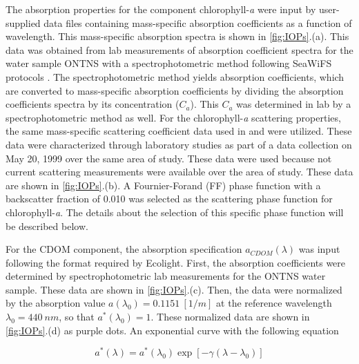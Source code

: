 \documentclass[onecolumn,3p,letterpaper,11pt]{elsarticle}
\begin{document}

The absorption properties for the component chlorophyll-{\it a} were input by user-supplied data files containing mass-specific absorption coefficients as a function of wavelength. This mass-specific absorption spectra is shown in \autoref{fig:IOPs}.(a). This data was obtained from lab measurements of absorption coefficient spectra for the water sample ONTNS with a spectrophotometric method following SeaWiFS protocols \citep{Mueller1995}. The spectrophotometric method yields absorption coefficients, which are converted to mass-specific absorption coefficients by dividing the absorption coefficients spectra by its concentration ($C_a$). This $C_a$ was determined in lab by a spectrophotometric method as well. For the chlorophyll-{\it a} scattering properties, the same mass-specific scattering coefficient data used in \citet{Raqueno:2000} and \citet{Raqueno:2003} were utilized. These data were characterized through laboratory studies as part of a data collection on May 20, 1999 over the same area of study. These data were used because not current scattering measurements were available over the area of study. These data are shown in \autoref{fig:IOPs}.(b). A Fournier-Forand (FF) phase function with a backscatter fraction of 0.010 was selected as the scattering phase function for chlorophyll-{\it a}. The details about the selection of this specific phase function will be described below.

For the CDOM component, the absorption specification $a_{CDOM}(\lambda)$ was input following the format required by Ecolight. First, the absorption coefficients were determined by spectrophotometric lab measurements for the ONTNS water sample. These data are shown in \autoref{fig:IOPs}.(c). Then, the data were normalized by the absorption value $a(\lambda_0)=0.1151~[1/m]$ at the reference wavelength $\lambda_0=440~nm$, so that $a^*(\lambda_0)=1$. These normalized data are shown in \autoref{fig:IOPs}.(d) as purple dots. An exponential curve with the following equation

\begin{equation}
	\label{eq:CDOMabs}
	a^*(\lambda)=a^*(\lambda_0)\exp{\left[-\gamma(\lambda-\lambda_0)\right]}
\end{equation}
\end{document}
